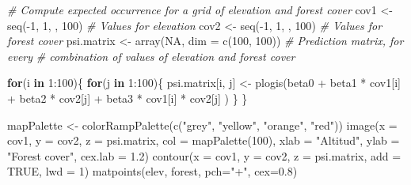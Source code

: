 \documentclass[
]{book}
\newenvironment{Shaded}{\begin{snugshade}}{\end{snugshade}}
\newcommand{\AttributeTok}[1]{\textcolor[rgb]{0.77,0.63,0.00}{#1}}
\newcommand{\CommentTok}[1]{\textcolor[rgb]{0.56,0.35,0.01}{\textit{#1}}}
\newcommand{\ConstantTok}[1]{\textcolor[rgb]{0.00,0.00,0.00}{#1}}
\newcommand{\ControlFlowTok}[1]{\textcolor[rgb]{0.13,0.29,0.53}{\textbf{#1}}}
\newcommand{\DecValTok}[1]{\textcolor[rgb]{0.00,0.00,0.81}{#1}}
\newcommand{\FloatTok}[1]{\textcolor[rgb]{0.00,0.00,0.81}{#1}}
\newcommand{\FunctionTok}[1]{\textcolor[rgb]{0.00,0.00,0.00}{#1}}
\newcommand{\NormalTok}[1]{#1}
\newcommand{\OtherTok}[1]{\textcolor[rgb]{0.56,0.35,0.01}{#1}}
\newcommand{\SpecialCharTok}[1]{\textcolor[rgb]{0.00,0.00,0.00}{#1}}
\newcommand{\StringTok}[1]{\textcolor[rgb]{0.31,0.60,0.02}{#1}}
\begin{document}
\begin{Shaded}
\begin{Highlighting}[]
\CommentTok{\# Compute expected occurrence for a grid of elevation and forest cover}
\NormalTok{cov1 }\OtherTok{\textless{}{-}} \FunctionTok{seq}\NormalTok{(}\SpecialCharTok{{-}}\DecValTok{1}\NormalTok{, }\DecValTok{1}\NormalTok{, , }\DecValTok{100}\NormalTok{)                       }\CommentTok{\# Values for elevation}
\NormalTok{cov2 }\OtherTok{\textless{}{-}} \FunctionTok{seq}\NormalTok{(}\SpecialCharTok{{-}}\DecValTok{1}\NormalTok{, }\DecValTok{1}\NormalTok{, , }\DecValTok{100}\NormalTok{)                       }\CommentTok{\# Values for forest cover}
\NormalTok{psi.matrix }\OtherTok{\textless{}{-}} \FunctionTok{array}\NormalTok{(}\ConstantTok{NA}\NormalTok{, }\AttributeTok{dim =} \FunctionTok{c}\NormalTok{(}\DecValTok{100}\NormalTok{, }\DecValTok{100}\NormalTok{))      }\CommentTok{\# Prediction matrix, for every }
\CommentTok{\# combination of values of elevation and forest cover}

\ControlFlowTok{for}\NormalTok{(i }\ControlFlowTok{in} \DecValTok{1}\SpecialCharTok{:}\DecValTok{100}\NormalTok{)\{}
   \ControlFlowTok{for}\NormalTok{(j }\ControlFlowTok{in} \DecValTok{1}\SpecialCharTok{:}\DecValTok{100}\NormalTok{)\{}
\NormalTok{      psi.matrix[i, j] }\OtherTok{\textless{}{-}} \FunctionTok{plogis}\NormalTok{(beta0 }\SpecialCharTok{+} 
\NormalTok{                                   beta1 }\SpecialCharTok{*}\NormalTok{ cov1[i] }\SpecialCharTok{+} 
\NormalTok{                                   beta2 }\SpecialCharTok{*}\NormalTok{ cov2[j] }\SpecialCharTok{+} 
\NormalTok{                                   beta3 }\SpecialCharTok{*}\NormalTok{ cov1[i] }\SpecialCharTok{*}\NormalTok{ cov2[j] )}
\NormalTok{   \}}
\NormalTok{\}}

\NormalTok{mapPalette }\OtherTok{\textless{}{-}} \FunctionTok{colorRampPalette}\NormalTok{(}\FunctionTok{c}\NormalTok{(}\StringTok{"grey"}\NormalTok{, }\StringTok{"yellow"}\NormalTok{, }\StringTok{"orange"}\NormalTok{, }\StringTok{"red"}\NormalTok{))}
\FunctionTok{image}\NormalTok{(}\AttributeTok{x =}\NormalTok{ cov1, }\AttributeTok{y =}\NormalTok{ cov2, }\AttributeTok{z =}\NormalTok{ psi.matrix, }\AttributeTok{col =} \FunctionTok{mapPalette}\NormalTok{(}\DecValTok{100}\NormalTok{), }\AttributeTok{xlab =} \StringTok{"Altitud"}\NormalTok{, }
      \AttributeTok{ylab =} \StringTok{"Forest cover"}\NormalTok{, }\AttributeTok{cex.lab =} \FloatTok{1.2}\NormalTok{)}
\FunctionTok{contour}\NormalTok{(}\AttributeTok{x =}\NormalTok{ cov1, }\AttributeTok{y =}\NormalTok{ cov2, }\AttributeTok{z =}\NormalTok{ psi.matrix, }\AttributeTok{add =} \ConstantTok{TRUE}\NormalTok{, }\AttributeTok{lwd =} \DecValTok{1}\NormalTok{)}
\FunctionTok{matpoints}\NormalTok{(elev, forest, }\AttributeTok{pch=}\StringTok{"+"}\NormalTok{, }\AttributeTok{cex=}\FloatTok{0.8}\NormalTok{)}
\end{Highlighting}
\end{Shaded}
\end{document}
